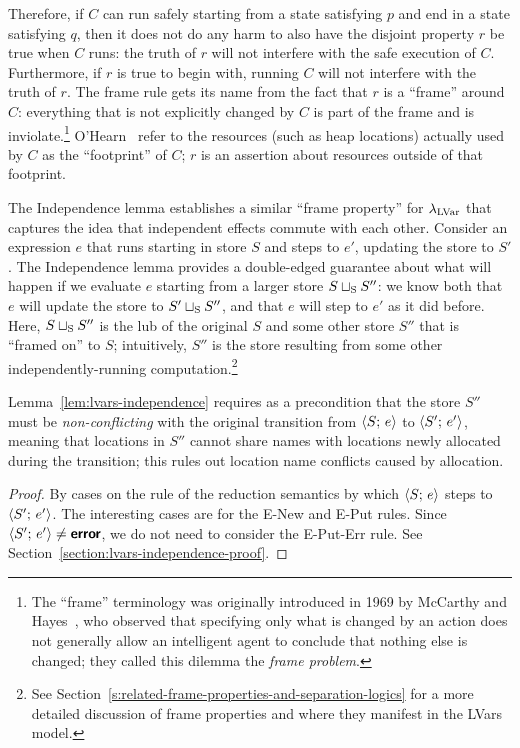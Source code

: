 Therefore, if $C$ can run safely starting from a state satisfying $p$
and end in a state satisfying $q$, then it does not do any harm to
also have the disjoint property $r$ be true when $C$ runs: the truth
of $r$ will not interfere with the safe execution of $C$.
Furthermore, if $r$ is true to begin with, running $C$ will not
interfere with the truth of $r$.  The frame rule gets its name from
the fact that $r$ is a ``frame'' around $C$: everything that is not
explicitly changed by $C$ is part of the frame and is
inviolate.\footnote{The ``frame'' terminology was originally
  introduced in 1969 by McCarthy and Hayes~,
  who observed that specifying only what is changed by an action does
  not generally allow an intelligent agent to conclude that nothing
  else is changed; they called this dilemma the \emph{frame problem}.}
O'Hearn \etal~refer to the resources (such as heap locations) actually
used by $C$ as the ``footprint'' of $C$; $r$ is an assertion about
resources outside of that footprint.

The Independence lemma establishes a similar ``frame property'' for
$\lambda_{\textrm{LVar}}$ that captures the idea that independent effects commute
with each other.  Consider an expression $e$ that runs starting in
store $S$ and steps to $e'$, updating the store to $S'$.  The
Independence lemma provides a double-edged guarantee about what will
happen if we evaluate $e$ starting from a larger store
$S \sqcup_{\mathrm{S}} S''$: we know both that $e$ will update the store to
$S' \sqcup_{\mathrm{S}} S''$, and that $e$ will step to $e'$ as it did before.
Here, $S \sqcup_{\mathrm{S}} S''$ is the lub of the original $S$ and some
other store $S''$ that is ``framed on'' to $S$; intuitively, $S''$ is
the store resulting from some other independently-running
computation.\footnote{See
  Section~\ref{s:related-frame-properties-and-separation-logics} for a
  more detailed discussion of frame properties and where they manifest
  in the LVars model.}

Lemma~\ref{lem:lvars-independence} requires as a precondition that the
store $S''$ must be \emph{non-conflicting} with the original
transition from $\langle S;\, e \rangle$ to $\langle S';\, e' \rangle$, meaning that
locations in $S''$ cannot share names with locations newly allocated
during the transition; this rules out location name conflicts caused
by allocation.

\LVarsDefNonConflicting

\LVarsLemIndependence
\ifdefined\DISSERTATION
\begin{proof}
  By cases on the rule of the reduction semantics by which
  $\langle S;\, e \rangle$ steps to $\langle S';\, e' \rangle$. The interesting cases
  are for the {\sc E-New} and {\sc E-Put} rules.  Since
  $\langle S';\, e' \rangle \neq \textbf{\textsf{error}}$, we do not need to consider the {\sc
    E-Put-Err} rule.  See
  Section~\ref{section:lvars-independence-proof}.
\end{proof}
\fi

